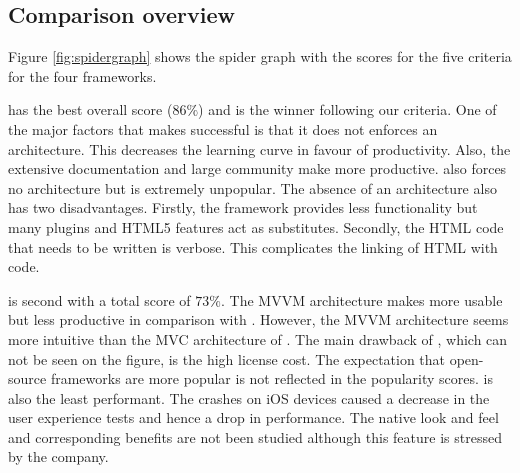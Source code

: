 \documentclass[a4paper]{artikel3}
\begin{document}
\begin{table}
\centering
{}
\caption{User experience of scrolling through a long list.}
\label{tabel:evaluatie-performantie-gebruikerservaring}
\end{table}


\subsection{Comparison overview} %
\label{sec:evaluation-overview}

Figure \ref{fig:spidergraph} shows the spider graph with the scores for the five criteria for the four frameworks.

\jqma{} has the best overall score ($86\%$) and is the winner following our criteria.
One of the major factors that makes \jqma{} successful is that it does not enforces an architecture.
This decreases the learning curve in favour of productivity.
Also,  the extensive documentation and large community make \jqma{} more productive.
\lungo{} also forces no architecture but is extremely unpopular.
The absence of 	an architecture also has two disadvantages.
Firstly,  the framework provides less functionality but many plugins and HTML5 features act as substitutes.
Secondly,  the HTML code that needs to be written is verbose.
This complicates the linking of HTML with \js{} code.

\kendoa{} is second with a total score of $73\%$.
The MVVM architecture makes \kendoa{} more usable but less productive in comparison with \jqma{}.
However,  the MVVM architecture seems more intuitive than the MVC architecture of \sta{}.
The main drawback of \kendoa{},  which can not be seen on the figure, is the high license cost.
The expectation that open-source frameworks are more popular is not reflected in the popularity scores.
\kendoa{} is also the least performant.
The crashes on iOS devices caused a decrease in the user experience tests and hence a drop in performance.
The native look and feel and corresponding benefits are not been studied although this feature is stressed by the \kendoa{} company.
\end{document}
